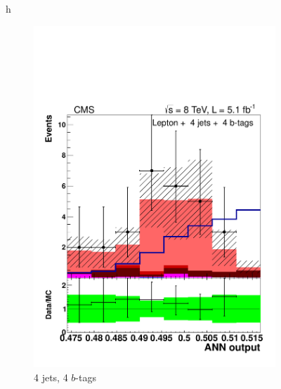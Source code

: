 \begin{figure}{h}
\begin{subfigure}[h]{0.31\textwidth}
        \includegraphics[width=\textwidth]{Figures/Analysis_1_Diagrams/d2MCPlots_CFMlpANN_cut7_j4_t4_Combined_HtWgt.pdf}
        \caption{4 jets, 4 $b$-tags}\label{lj_ANNoutput_8TeV_5}
      \end{subfigure}
      ~ %
      \begin{subfigure}[h]{0.31\textwidth}

\end{subfigure}
\end{figure}
